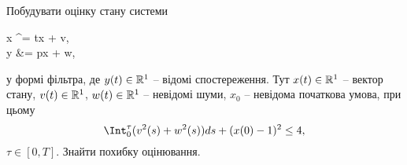 \begin{problem}
    Побудувати оцінку стану системи
    \begin{system*}
        \dot x ^= tx + v, \\
        y &= px + w,
    \end{system*}
    у формі фільтра, де $y(t)\in\mathbb{R}^1$ -- відомі спостереження. Тут $x(t) \in \mathbb{R}^1$ -- вектор стану, $v(t)\in\mathbb{R}^1$, $w(t)\in\mathbb{R}^1$ -- невідомі шуми, $x_0$ -- невідома початкова умова, при цьому
    \[ \Int_0^\tau (v^2(s) + w^2(s)) ds + (x(0) - 1)^2 \le 4, \]
    $\tau \in [0, T]$. Знайти похибку оцінювання.
\end{problem}

\begin{solution}

\end{solution}

\setcounter{section}{6}

\setcounter{problem}{8}

\begin{problem}

\end{problem}

\begin{solution}

\end{solution}
